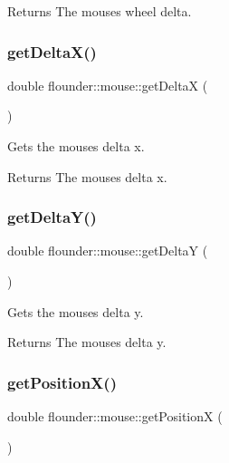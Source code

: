 \begin{DoxyReturn}{Returns}
The mouses wheel delta. 
\end{DoxyReturn}
\mbox{\label{classflounder_1_1mouse_ac4109903ff369214a5b6466a014d04dd}} 
\subsubsection{\texorpdfstring{get\+Delta\+X()}{getDeltaX()}}
{\footnotesize\ttfamily double flounder\+::mouse\+::get\+DeltaX (\begin{DoxyParamCaption}{ }\end{DoxyParamCaption})}



Gets the mouses delta x. 

\begin{DoxyReturn}{Returns}
The mouses delta x. 
\end{DoxyReturn}
\mbox{\label{classflounder_1_1mouse_a97c8ce905344917d6b57d9c0c0ea532a}} 
\subsubsection{\texorpdfstring{get\+Delta\+Y()}{getDeltaY()}}
{\footnotesize\ttfamily double flounder\+::mouse\+::get\+DeltaY (\begin{DoxyParamCaption}{ }\end{DoxyParamCaption})}



Gets the mouses delta y. 

\begin{DoxyReturn}{Returns}
The mouses delta y. 
\end{DoxyReturn}
\mbox{\label{classflounder_1_1mouse_ab1f034dd18edcd5099615b7a1958b71d}} 
\subsubsection{\texorpdfstring{get\+Position\+X()}{getPositionX()}}
{\footnotesize\ttfamily double flounder\+::mouse\+::get\+PositionX (\begin{DoxyParamCaption}{ }\end{DoxyParamCaption})}



